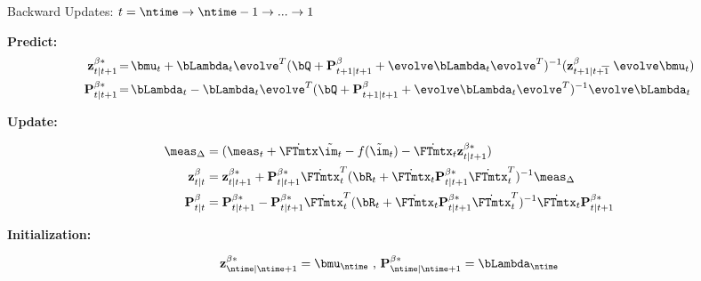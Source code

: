 \begin{algorithm}[b]
	\caption{Backward Updates: {\footnotesize $t = \ntime \rightarrow \ntime-1 \rightarrow ... \rightarrow 1 \hspace{-.1in}$ }  \label{alg:backward}}
	
	{\bf Predict:}
	{\footnotesize
		\begin{align}
		\notag {\bf z}^{\beta*}_{t|t+1}  & \hspace{-.02in} = \hspace{-.02in} \bmu_t  + \bLambda_t  \evolve^T ( \bQ + {\bf P}^{\beta}_{t+1|t+1} +  \evolve \bLambda_t  \evolve^T )^{-1} (  {\bf z}^{\beta}_{t+1|t+1} \hspace{-.13in} -   \evolve \bmu_t ) \\
		\notag  {\bf P}^{\beta*}_{t|t+1} &  \hspace{-.02in}= \hspace{-.02in} \bLambda_t - \bLambda_t \evolve^T (  \bQ + {\bf P}^{\beta}_{t+1|t+1} + \evolve \bLambda_t  \evolve^T )^{-1}  \evolve \bLambda_t 
		\end{align}
	}
	
	
	{\bf Update:}
	
	{\footnotesize
		\begin{align}
		\notag \meas_\Delta &= (  \meas_t + \dot{\FTmtx} \tilde{\im_t} - f(\tilde{\im}_t) -  \dot{\FTmtx}_t {\bf z}^{\beta*}_{t|t+1} ) \\
		\notag  {\bf z}^{\beta}_{t|t} &  =  {\bf z}^{\beta*}_{t|t+1}  + {\bf P}^{\beta*}_{t|t+1} \dot{\FTmtx}_t^T ( \bR_t +  \dot{\FTmtx}_t {\bf P}^{\beta*}_{t|t+1} \dot{\FTmtx}_t^T )^{-1} \meas_\Delta \\
		\notag  {\bf P}^{\beta}_{t|t} & = {\bf P}^{\beta*}_{t|t+1} - {\bf P}^{\beta*}_{t|t+1}\dot{\FTmtx}_t^T ( \bR_t + \dot{\FTmtx}_t {\bf P}^{\beta*}_{t|t+1} \dot{\FTmtx}_t^T )^{-1} \dot{\FTmtx}_t {\bf P}^{\beta*}_{t|t+1} 
		\end{align}
	}
	
	
	{\bf Initialization:}
	
	{\footnotesize
		\begin{align}
		\notag  {\bf z}^{\beta*}_{\ntime|\ntime+1} = \bmu_{\ntime} \mbox{   ,   } {\bf P}^{\beta*}_{\ntime|\ntime+1}   = \bLambda_{\ntime}
		\end{align}
	}
	
	
\end{algorithm}


\vspace{-.1in}

